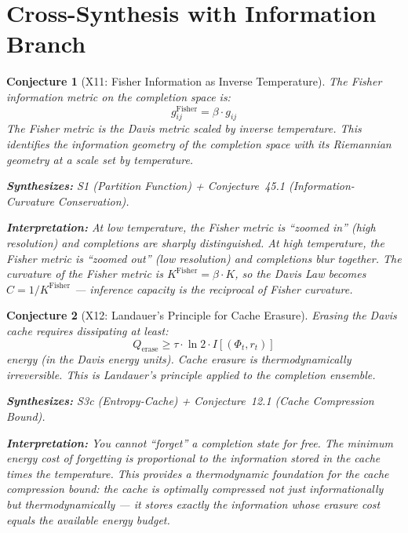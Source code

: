 \documentclass[11pt,letterpaper]{article}
\newtheorem{conjecture}{Conjecture}[section]
\begin{document}
\section{Cross-Synthesis with Information Branch}

\begin{conjecture}[X11: Fisher Information as Inverse 
Temperature]\label{conj:x_fisher}
The Fisher information metric on the completion space is:
\begin{equation}
    g_{ij}^{\mathrm{Fisher}} = \beta \cdot g_{ij}
\end{equation}
The Fisher metric is the Davis metric scaled by inverse temperature. This 
identifies the information geometry of the completion space with its 
Riemannian geometry at a scale set by temperature.

\textbf{Synthesizes:} S1 (Partition Function) + Conjecture~45.1 
(Information-Curvature Conservation).

\textbf{Interpretation:} At low temperature, the Fisher metric is 
``zoomed in'' (high resolution) and completions are sharply distinguished. 
At high temperature, the Fisher metric is ``zoomed out'' (low resolution) 
and completions blur together. The curvature of the Fisher metric is 
$K^{\mathrm{Fisher}} = \beta \cdot K$, so the Davis Law becomes $C = 
1 / K^{\mathrm{Fisher}}$ --- inference capacity is the reciprocal of 
Fisher curvature.
\end{conjecture}

\begin{conjecture}[X12: Landauer's Principle for Cache 
Erasure]\label{conj:x_landauer}
Erasing the Davis cache requires dissipating at least:
\begin{equation}
    Q_{\mathrm{erase}} \geq \tau \cdot \ln 2 \cdot I[(\Phi_t, r_t)]
\end{equation}
energy (in the Davis energy units). Cache erasure is thermodynamically 
irreversible. This is Landauer's principle applied to the completion 
ensemble.

\textbf{Synthesizes:} S3c (Entropy-Cache) + Conjecture~12.1 
(Cache Compression Bound).

\textbf{Interpretation:} You cannot ``forget'' a completion state for 
free. The minimum energy cost of forgetting is proportional to the 
information stored in the cache times the temperature. This provides a 
thermodynamic foundation for the cache compression bound: the cache is 
optimally compressed not just informationally but thermodynamically --- it 
stores exactly the information whose erasure cost equals the available 
energy budget.
\end{conjecture}
\end{document}
